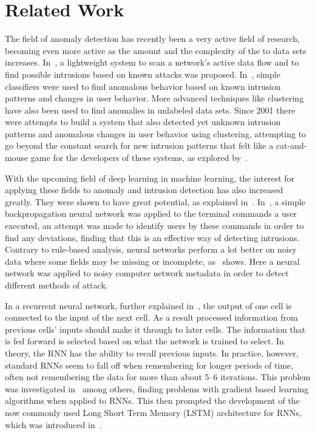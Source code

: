 \chapter{Related Work}\label{ch:related_work}

The field of anomaly detection has recently been a very active field of research, becoming even more active as the amount and the complexity of the to data sets increases. In~\cite{roesch1999snort}, a lightweight system to scan a network's active data flow and to find possible intrusions based on known attacks was proposed. In~\cite{lee1998data}, simple classifiers were used to find anomalous behavior based on known intrusion patterns and changes in user behavior. More advanced techniques like clustering have also been used to find anomalies in unlabeled data sets. Since 2001 there were attempts to build a system that also detected yet unknown intrusion patterns and anomalous changes in user behavior using clustering, attempting to go beyond the constant search for new intrusion patterns that felt like a cat-and-mouse game for the developers of these systems, as explored by~\cite{Portnoy01intrusiondetection}.

With the upcoming field of deep learning in machine learning, the interest for applying these fields to anomaly and intrusion detection has also increased greatly. They were shown to have great potential, as explained in~\cite{lecun2015deep}. In~\cite{ryan1998intrusion}, a simple backpropagation neural network was applied to the terminal commands a user executed, an attempt was made to identify users by these commands in order to find any deviations, finding that this is an effective way of detecting intrusions. Contrary to rule-based analysis, neural networks perform a lot better on noisy data where some fields may be missing or incomplete, as~\cite{cannady1998artificial} shows. Here a neural network was applied to noisy computer network metadata in order to detect different methods of attack.

In a recurrent neural network, further explained in~\cite{lecun2015deep}, the output of one cell is connected to the input of the next cell. As a result processed information from previous cells' inputs should make it through to later cells. The information that is fed forward is selected based on what the network is trained to select. In theory, the RNN has the ability to recall previous inputs. In practice, however, standard RNNs seem to fall off when remembering for longer periods of time, often not remembering the data for more than about 5--6 iterations. This problem was investigated in~\cite{bengio1994learning} among others, finding problems with gradient based learning algorithms when applied to RNNs. This then prompted the development of the now commonly used Long Short Term Memory (LSTM) architecture for RNNs, which was introduced in~\cite{hochreiter1997long}.

